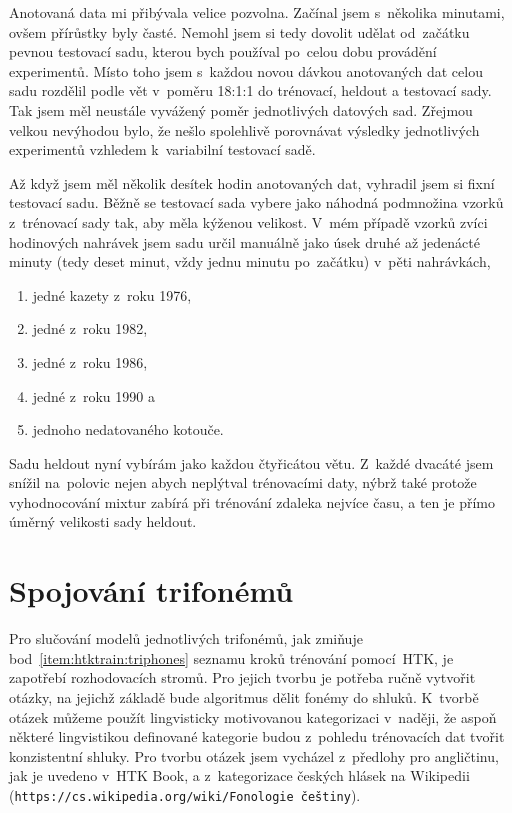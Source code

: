 Anotovaná data mi přibývala velice pozvolna. Začínal jsem s~několika minutami,
ovšem přírůstky byly časté. Nemohl jsem si tedy dovolit udělat od~začátku pevnou
testovací sadu, kterou bych používal po~celou dobu provádění experimentů. Místo
toho jsem s~každou novou dávkou anotovaných dat celou sadu rozdělil podle vět
v~poměru 18:1:1 do trénovací, heldout a testovací sady. Tak jsem měl neustále
vyvážený poměr jednotlivých datových sad. Zřejmou velkou nevýhodou bylo, že
nešlo spolehlivě porovnávat výsledky jednotlivých experimentů vzhledem
k~variabilní testovací sadě.

Až když jsem měl několik desítek hodin anotovaných dat, vyhradil jsem si fixní
testovací sadu. Běžně se testovací sada vybere jako náhodná podmnožina vzorků
z~trénovací sady tak, aby měla kýženou velikost. V~mém případě vzorků zvíci
hodinových nahrávek jsem sadu určil manuálně jako úsek druhé až jedenácté minuty
(tedy deset minut, vždy jednu minutu po~začátku) v~pěti nahrávkách,
\begin{enumerate}
\item{jedné kazety z~roku 1976,}
\item{jedné z~roku 1982,}
\item{jedné z~roku 1986,}
\item{jedné z~roku 1990 a}
\item{jednoho nedatovaného kotouče.}
\end{enumerate}

Sadu heldout nyní vybírám jako každou čtyřicátou větu. Z~každé dvacáté jsem
snížil na~polovic nejen abych neplýtval trénovacími daty, nýbrž také protože
vyhodnocování mixtur zabírá při trénování zdaleka nejvíce času, a ten je přímo
úměrný velikosti sady heldout.

\section{Spojování trifonémů}

Pro slučování modelů jednotlivých trifonémů, jak zmiňuje
bod~\ref{item:htktrain:triphones} seznamu kroků trénování pomocí~HTK, je
zapotřebí rozhodovacích stromů. Pro jejich tvorbu je potřeba ručně vytvořit
otázky, na jejichž základě bude algoritmus dělit fonémy do shluků. K~tvorbě
otázek můžeme použít lingvisticky motivovanou kategorizaci v~naději, že aspoň
některé lingvistikou definované kategorie budou z~pohledu trénovacích dat tvořit
konzistentní shluky. Pro tvorbu otázek jsem vycházel z~předlohy pro
angličtinu, jak je uvedeno v~HTK Book, a z~kategorizace českých hlásek na Wikipedii
(\texttt{https://cs.wikipedia.org/wiki/Fonologie~češtiny}).

